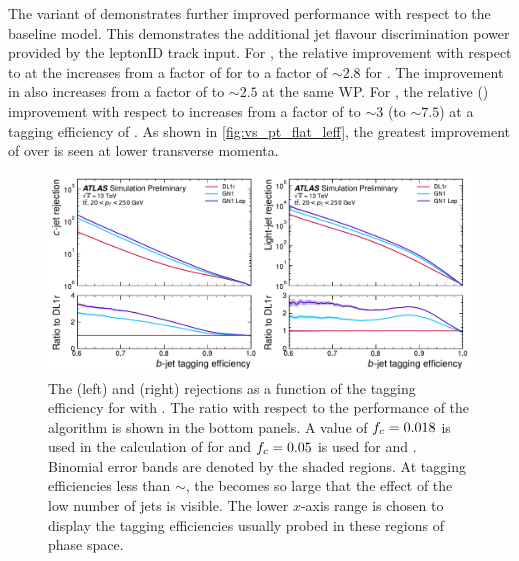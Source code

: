 The \GNNLep variant of \GNN demonstrates further improved performance with respect to the baseline model.
This demonstrates the additional jet flavour discrimination power provided by the leptonID track input.
For \ttbarjets, the relative \crej improvement with respect to \DLr at the \bWP{\ttlo} increases from a factor of \ttbclo for \GNN to a factor of $\sim 2.8$ for \GNNLep.
The improvement in \lrej also increases from a factor of \ttbllo to $\sim 2.5$ at the same WP.
For \Zprimejets, the relative \crej (\lrej) improvement with respect to \DLr increases from a factor of \zpbclo to $\sim 3$ (\zpbllo to $\sim 7.5$) at a \bjet tagging efficiency of \pct{\zplo}.
As shown in \cref{fig:vs_pt_flat_leff}, the greatest improvement of \GNNLep over \GNN is seen at lower transverse momenta.

\begin{figure}[!p]
    \centering
    \includegraphics[width=\textwidth]{chapters/gnn_tagger/figs/results/main/ttbar/ttbar_roc_btag.pdf}
    \caption{The \cjet (left) and \ljet (right) rejections as a function of the \bjet tagging efficiency for \ttbarjets with \ttbarpt.
             The ratio with respect to the performance of the \DLr algorithm is shown in the bottom panels.
             A value of $f_c = 0.018$ is used in the calculation of \Db for \DLr and $f_c = 0.05$ is used for \GNN and \GNNLep.
             Binomial error bands are denoted by the shaded regions.
             At \bjet tagging efficiencies less than $\sim$, the \lrej becomes so large that the effect of the low number of jets is visible.
             The lower $x$-axis range is chosen to display the \bjet tagging efficiencies usually probed in these regions of phase space.}
    \label{fig:ttbar_btag_roc}
\end{figure}

